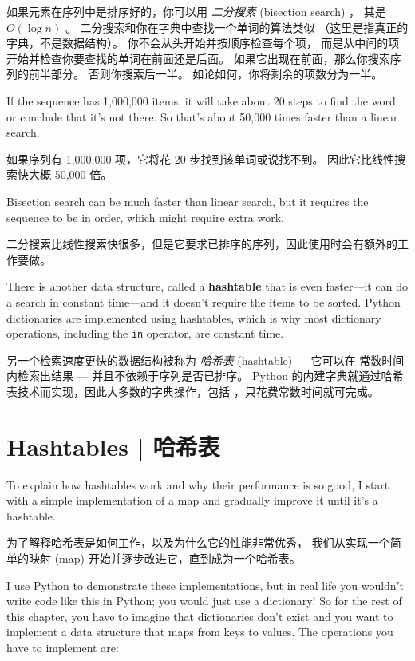 如果元素在序列中是排序好的，你可以用 {\em 二分搜素} (bisection search) ，
其是 $O(\log n)$ 。 二分搜索和你在字典中查找一个单词的算法类似
（这里是指真正的字典，不是数据结构）。 你不会从头开始并按顺序检查每个项，
而是从中间的项开始并检查你要查找的单词在前面还是后面。
如果它出现在前面，那么你搜索序列的前半部分。
否则你搜索后一半。 如论如何，你将剩余的项数分为一半。
  

If the sequence has 1,000,000 items, it will take about 20 steps to
find the word or conclude that it's not there.  So that's about 50,000
times faster than a linear search.

如果序列有 1,000,000 项，它将花 20 步找到该单词或说找不到。
因此它比线性搜索快大概 50,000 倍。

Bisection search can be much faster than linear search, but
it requires the sequence to be in order, which might require
extra work.

二分搜索比线性搜索快很多，但是它要求已排序的序列，因此使用时会有额外的工作要做。

There is another data structure, called a {\bf hashtable} that
is even faster---it can do a search in constant time---and it
doesn't require the items to be sorted.  Python dictionaries
are implemented using hashtables, which is why most dictionary
operations, including the {\tt in} operator, are constant time.

另一个检索速度更快的数据结构被称为 {\em 哈希表} (hashtable) --- 它可以在 常数时间 内检索出结果 --- 并且不依赖于序列是否已排序。 Python 的内建字典就通过哈希表技术而实现，因此大多数的字典操作，包括  ，只花费常数时间就可完成。



\section{Hashtables  |  哈希表}
\label{hashtable}

To explain how hashtables work and why their performance is so
good, I start with a simple implementation of a map and
gradually improve it until it's a hashtable.

为了解释哈希表是如何工作，以及为什么它的性能非常优秀，
我们从实现一个简单的映射 (map) 开始并逐步改进它，直到成为一个哈希表。
  

I use Python to demonstrate these implementations, but in real
life you wouldn't write code like this in Python; you would just use a
dictionary!  So for the rest of this chapter, you have to imagine that
dictionaries don't exist and you want to implement a data structure
that maps from keys to values.  The operations you have to
implement are:

